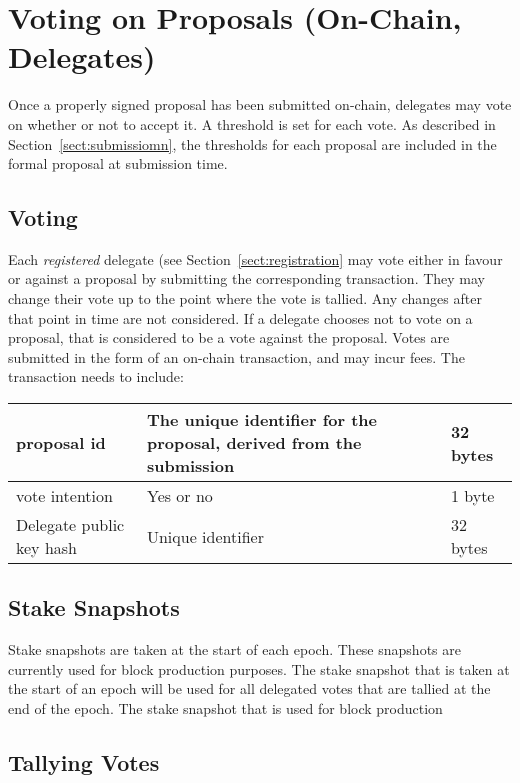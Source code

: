 \newpage
\section{Voting on Proposals (On-Chain, Delegates)}
\label{sect:voting}

Once a properly signed proposal has been submitted on-chain, delegates may vote on whether or not to accept it.  A threshold is set for each vote.
As described in Section~\ref{sect:submissiomn}, the thresholds for each proposal are included in the formal proposal at submission time.

\subsection{Voting}

Each \emph{registered} delegate (see Section~\ref{sect:registration} may vote either in favour or against a proposal by submitting the corresponding transaction.  They may change their vote up to the point
where the vote is tallied.  Any changes after that point in time are not considered.  If a delegate chooses not to vote on a proposal, that is considered to be
a vote against the proposal.  Votes are submitted in the form of an on-chain transaction, and may incur fees.  The transaction needs to include:

\begin{tabular}{||l|p{3in}|l||}
  \hline\hline
  proposal id & The unique identifier for the proposal, derived from the submission & 32 bytes
  \\\hline
  vote intention & Yes or no & 1 byte
  \\\hline
  Delegate public key hash & Unique identifier & 32 bytes
  \\\hline
  \hline
\end{tabular}

\subsection{Stake Snapshots}

Stake snapshots are taken at the start of each epoch.  These snapshots are currently used for block production purposes.  The stake snapshot that is taken at the start
of an epoch will be used for all delegated votes that are tallied at the end of the epoch.  The stake snapshot that is used for block production


\subsection{Tallying Votes}

